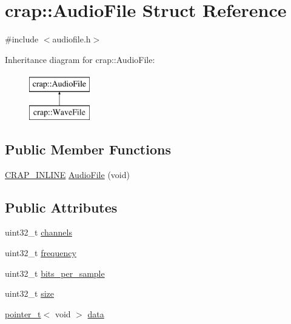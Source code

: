 \hypertarget{structcrap_1_1_audio_file}{}\section{crap\+:\+:Audio\+File Struct Reference}
\label{structcrap_1_1_audio_file}


{\ttfamily \#include $<$audiofile.\+h$>$}

Inheritance diagram for crap\+:\+:Audio\+File\+:\begin{figure}[H]
\begin{center}
\leavevmode
\includegraphics[height=2.000000cm]{structcrap_1_1_audio_file}
\end{center}
\end{figure}
\subsection*{Public Member Functions}
\begin{DoxyCompactItemize}
\item 
\hyperlink{config__x86_8h_a5a40526b8d842e7ff731509998bb0f1c}{C\+R\+A\+P\+\_\+\+I\+N\+L\+I\+N\+E} \hyperlink{structcrap_1_1_audio_file_aeae5293f38a1e00a3d3e48028d724cd3}{Audio\+File} (void)
\end{DoxyCompactItemize}
\subsection*{Public Attributes}
\begin{DoxyCompactItemize}
\item 
uint32\+\_\+t \hyperlink{structcrap_1_1_audio_file_a78b93f01a2e9b481371ef7c64b7fabb4}{channels}
\item 
uint32\+\_\+t \hyperlink{structcrap_1_1_audio_file_ae5c7beff491714d262eea53b7760f1a2}{frequency}
\item 
uint32\+\_\+t \hyperlink{structcrap_1_1_audio_file_aa5ea8a9d1a5c7d7f04b93f5832f2ae5b}{bits\+\_\+per\+\_\+sample}
\item 
uint32\+\_\+t \hyperlink{structcrap_1_1_audio_file_ad5c536e16fbd38393346b0bc2c7ba099}{size}
\item 
\hyperlink{structcrap_1_1pointer__t}{pointer\+\_\+t}$<$ void $>$ \hyperlink{structcrap_1_1_audio_file_a0c75cc1dfed89dc59fb3868cdf2a8b2e}{data}
\end{DoxyCompactItemize}



